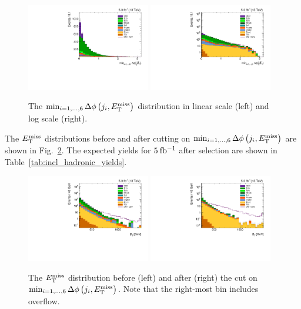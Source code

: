 \begin{figure}[htbp]
  \centering
  \includegraphics[width=0.48\textwidth]{figures/hadronic-incl-dphijetmet6.pdf}
  \includegraphics[width=0.48\textwidth]{figures/hadronic-incl-dphijetmet6log.pdf}
  \caption{The $\min_{i=1,\ldots,6}\Delta\phi\left(j_i,E_\mathrm{T}^{\mathrm{miss}}\right)$ distribution in linear scale (left) and log scale (right).}
  \label{fig:dphijetmet6}
\end{figure}

The $E_\mathrm{T}^{\mathrm{miss}}$ distributions before and after cutting on $\min_{i=1,\ldots,6}\Delta\phi\left(j_i,E_\mathrm{T}^{\mathrm{miss}}\right)$ are shown in Fig.~\ref{fig:incl_hadronic_met}. The expected yields for $5\:\mathrm{fb^{-1}}$ after selection are shown in Table~\ref{tab:incl_hadronic_yields}.

\begin{figure}[htbp]
  \centering
  \includegraphics[width=0.48\textwidth]{figures/hadronic-incl-metlog_nodphi.pdf}
  \includegraphics[width=0.48\textwidth]{figures/hadronic-incl-metlog.pdf}
  \caption{The $E_\mathrm{T}^{\mathrm{miss}}$ distribution before (left) and after (right) the cut on $\min_{i=1,\ldots,6}\Delta\phi\left(j_i,E_\mathrm{T}^{\mathrm{miss}}\right)$. Note that the right-most bin includes overflow.}
  \label{fig:incl_hadronic_met}
\end{figure}

